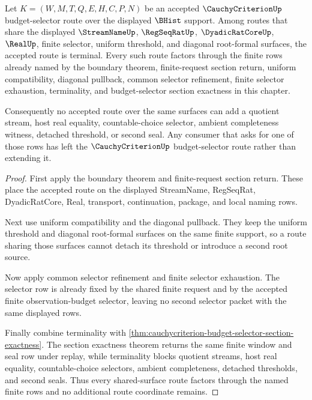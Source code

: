 \begin{theorem}
\label{thm:cauchycriterion-budget-selector-terminal-route-exhaustion}
Let $K=(W,M,T,Q,E,H,C,P,N)$ be an accepted $\CauchyCriterionUp$ budget-selector route over the displayed $\BHist$ support. Among routes that share the displayed $\StreamNameUp$, $\RegSeqRatUp$, $\DyadicRatCoreUp$, $\RealUp$, finite selector, uniform threshold, and diagonal root-formal surfaces, the accepted route is terminal. Every such route factors through the finite rows already named by the boundary theorem, finite-request section return, uniform compatibility, diagonal pullback, common selector refinement, finite selector exhaustion, terminality, and budget-selector section exactness in this chapter.

Consequently no accepted route over the same surfaces can add a quotient stream, host real equality, countable-choice selector, ambient completeness witness, detached threshold, or second seal. Any consumer that asks for one of those rows has left the $\CauchyCriterionUp$ budget-selector route rather than extending it.
\end{theorem}
\begin{proof}
First apply the boundary theorem and finite-request section return. These place the accepted route on the displayed StreamName, RegSeqRat, DyadicRatCore, Real, transport, continuation, package, and local naming rows.

Next use uniform compatibility and the diagonal pullback. They keep the uniform threshold and diagonal root-formal surfaces on the same finite support, so a route sharing those surfaces cannot detach its threshold or introduce a second root source.

Now apply common selector refinement and finite selector exhaustion. The selector row is already fixed by the shared finite request and by the accepted finite observation-budget selector, leaving no second selector packet with the same displayed rows.

Finally combine terminality with \autoref{thm:cauchycriterion-budget-selector-section-exactness}. The section exactness theorem returns the same finite window and seal row under replay, while terminality blocks quotient streams, host real equality, countable-choice selectors, ambient completeness, detached thresholds, and second seals. Thus every shared-surface route factors through the named finite rows and no additional route coordinate remains.
\end{proof}

